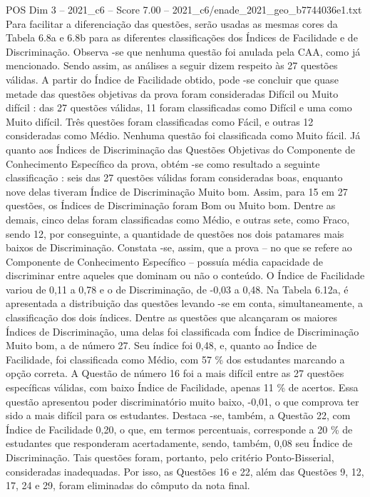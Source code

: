 \begin{textsample}{POS Dim 3 – 2021\_c6 – Score 7.00 – 2021\_c6/enade\_2021\_geo\_b7744036e1.txt}
Para facilitar a diferenciação das questões, serão usadas as mesmas cores da Tabela 6.8a e 6.8b para as diferentes classificações dos Índices de Facilidade e de Discriminação.
Observa -se que nenhuma questão foi anulada pela CAA, como já mencionado.
Sendo assim, as análises a seguir dizem respeito às 27 questões válidas.
A partir do Índice de Facilidade obtido, pode -se concluir que quase metade das questões objetivas da prova foram consideradas Difícil ou Muito difícil : das 27 questões válidas, 11 foram classificadas como Difícil e uma como Muito difícil.
Três questões foram classificadas como Fácil, e outras 12 consideradas como Médio.
Nenhuma questão foi classificada como Muito fácil.
Já quanto aos Índices de Discriminação das Questões Objetivas do Componente de Conhecimento Específico da prova, obtém -se como resultado a seguinte classificação : seis das 27 questões válidas foram consideradas boas, enquanto nove delas tiveram Índice de Discriminação Muito bom.
Assim, para 15 em 27 questões, os Índices de Discriminação foram Bom ou Muito bom.
Dentre as demais, cinco delas foram classificadas como Médio, e outras sete, como Fraco, sendo 12, por conseguinte, a quantidade de questões nos dois patamares mais baixos de Discriminação.
Constata -se, assim, que a prova – no que se refere ao Componente de Conhecimento Específico – possuía média capacidade de discriminar entre aqueles que dominam ou não o conteúdo.
O Índice de Facilidade variou de 0,11 a 0,78 e o de Discriminação, de -0,03 a 0,48.
Na Tabela 6.12a, é apresentada a distribuição das questões levando -se em conta, simultaneamente, a classificação dos dois índices.
Dentre as questões que alcançaram os maiores Índices de Discriminação, uma delas foi classificada com Índice de Discriminação Muito bom, a de número 27.
Seu índice foi 0,48, e, quanto ao Índice de Facilidade, foi classificada como Médio, com 57 \% dos estudantes marcando a opção correta.
A Questão de número 16 foi a mais difícil entre as 27 questões específicas válidas, com baixo Índice de Facilidade, apenas 11 \% de acertos.
Essa questão apresentou poder discriminatório muito baixo, -0,01, o que comprova ter sido a mais difícil para os estudantes.
Destaca -se, também, a Questão 22, com Índice de Facilidade 0,20, o que, em termos percentuais, corresponde a 20 \% de estudantes que responderam acertadamente, sendo, também, 0,08 seu Índice de Discriminação.
Tais questões foram, portanto, pelo critério Ponto-Bisserial, consideradas inadequadas.
Por isso, as Questões 16 e 22, além das Questões 9, 12, 17, 24 e 29, foram eliminadas do cômputo da nota final.

\end{textsample}
